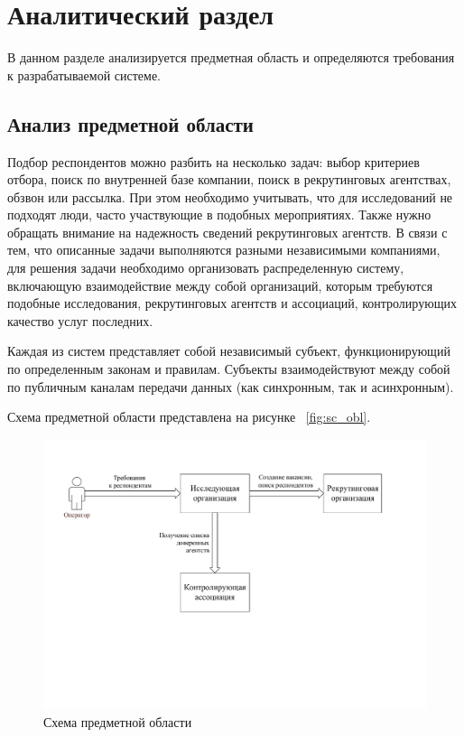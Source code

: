 \chapter{Аналитический раздел}
\label{cha:analysis}
%
%
В данном разделе анализируется предметная область и определяются требования к разрабатываемой системе.

\section{Анализ предметной области}
Подбор респондентов можно разбить на несколько задач: выбор критериев отбора, поиск по внутренней базе компании, поиск в рекрутинговых агентствах, обзвон или рассылка. При этом необходимо учитывать, что для исследований не подходят люди, часто участвующие в подобных мероприятиях. Также нужно обращать внимание на надежность сведений рекрутинговых агентств. В связи с тем, что описанные задачи выполняются разными независимыми компаниями, для решения задачи необходимо организовать распределенную систему, включающую взаимодействие между собой организаций, которым требуются подобные исследования, рекрутинговых агентств и ассоциаций, контролирующих качество услуг последних.

Каждая из систем представляет собой независимый субъект, функционирующий по определенным законам и правилам. Субъекты взаимодействуют между собой по публичным каналам передачи данных (как синхронным, так и асинхронным).

Схема предметной области представлена на рисунке ~\ref{fig:sc_obl}.

\begin{figure}[ht]
  \centering
  \includegraphics[width=\textwidth]{include/sc-obl.pdf}
  \caption{Схема предметной области}
  \label{fig:sc-obl}
\end{figure}

